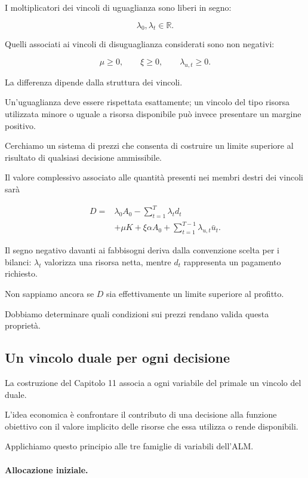 I moltiplicatori dei vincoli di uguaglianza
sono liberi in segno:

\[
\lambda_0,\lambda_t\in\mathbb{R}.
\]

Quelli associati ai vincoli di disuguaglianza
considerati sono non negativi:

\[
\mu\geq0,\qquad
\xi\geq0,\qquad
\lambda_{u,t}\geq0.
\]

La differenza dipende dalla struttura dei vincoli.

Un'uguaglianza deve essere rispettata esattamente;
un vincolo del tipo risorsa utilizzata minore
o uguale a risorsa disponibile pu\`{o} invece
presentare un margine positivo.

Cerchiamo un sistema di prezzi che consenta
di costruire un limite superiore al risultato
di qualsiasi decisione ammissibile.

Il valore complessivo associato alle quantit\`{a}
presenti nei membri destri dei vincoli sar\`{a}

\[
\begin{aligned}
D={}&
\lambda_0 A_0
-\sum_{t=1}^{T}\lambda_t d_t\\
&+\mu K+\xi\alpha A_0
+\sum_{t=1}^{T-1}\lambda_{u,t}\bar u_t.
\end{aligned}
\]

Il segno negativo davanti ai fabbisogni
deriva dalla convenzione scelta per i bilanci:
$\lambda_t$ valorizza una risorsa netta,
mentre $d_t$ rappresenta un pagamento richiesto.

Non sappiamo ancora se $D$ sia effettivamente
un limite superiore al profitto.

Dobbiamo determinare quali condizioni sui
prezzi rendano valida questa propriet\`{a}.

\subsection{Un vincolo duale per ogni decisione}

La costruzione del Capitolo 11 associa a ogni
variabile del primale un vincolo del duale.

L'idea economica \`{e} confrontare il contributo
di una decisione alla funzione obiettivo con
il valore implicito delle risorse che essa
utilizza o rende disponibili.

Applichiamo questo principio alle tre famiglie
di variabili dell'ALM.

\paragraph{Allocazione iniziale.}

